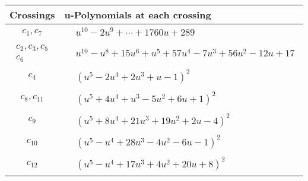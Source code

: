 \documentclass[1p]{elsarticle_modified}
\theoremstyle{definition}
\begin{document}
\begin{tabular}{m{50pt}|m{274pt}}
Crossings & \hspace{64pt}u-Polynomials at each crossing \\
\hline $$\begin{aligned}c_{1},c_{7}\end{aligned}$$&$\begin{aligned}
&u^{10}-2 u^9+\cdots+1760 u+289
\end{aligned}$\\
\hline $$\begin{aligned}c_{2},c_{3},c_{5}\\c_{6}\end{aligned}$$&$\begin{aligned}
&u^{10}- u^8+15 u^6+u^5+57 u^4-7 u^3+56 u^2-12 u+17
\end{aligned}$\\
\hline $$\begin{aligned}c_{4}\end{aligned}$$&$\begin{aligned}
&(u^5-2 u^4+2 u^3+u-1)^2
\end{aligned}$\\
\hline $$\begin{aligned}c_{8},c_{11}\end{aligned}$$&$\begin{aligned}
&(u^5+4 u^4+u^3-5 u^2+6 u+1)^2
\end{aligned}$\\
\hline $$\begin{aligned}c_{9}\end{aligned}$$&$\begin{aligned}
&(u^5+8 u^4+21 u^3+19 u^2+2 u-4)^2
\end{aligned}$\\
\hline $$\begin{aligned}c_{10}\end{aligned}$$&$\begin{aligned}
&(u^5- u^4+28 u^3-4 u^2-6 u-1)^2
\end{aligned}$\\
\hline $$\begin{aligned}c_{12}\end{aligned}$$&$\begin{aligned}
&(u^5- u^4+17 u^3+4 u^2+20 u+8)^2
\end{aligned}$\\
\hline
\end{tabular}\\~\\
\end{document}
